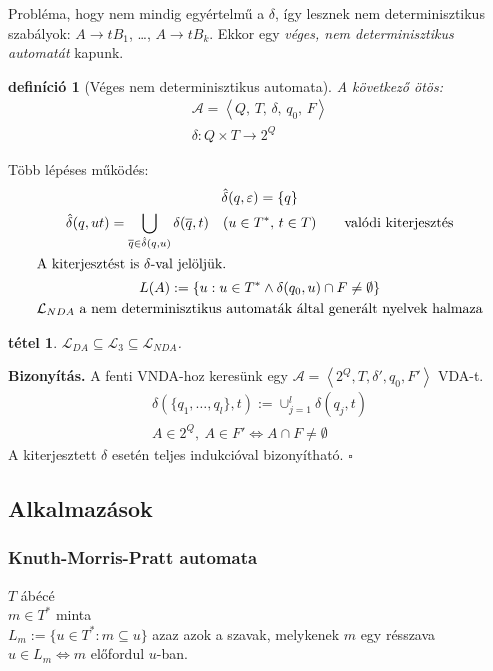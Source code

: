 \documentclass[fleqn,10pt,a4paper]{article}
\newcommand{\ob}{\hfill$\square$}
\renewcommand{\epsilon}{\varepsilon}
\theoremstyle{magyar}
\newtheorem{de}{definíció}[section]
\newtheorem{te}{tétel}[section]
\newenvironment{biz}{\begin{trivlist}\item\relax\mbox{\textbf{Bizonyítás.\enskip}}\ignorespaces}{\ob\end{trivlist}}
\newcommand{\Lang}{\mathcal{L}}
\newcommand{\A}{\mathcal{A}}
\newcommand{\VDA}{\A}
\newcommand{\VNDA}{\A}
\begin{document}
  Probléma, hogy nem mindig egyértelmű a $\delta$, így lesznek nem determinisztikus szabályok: $A\to tB_1$, \ldots,
  $A\to  tB_k$. Ekkor egy \emph{véges, nem determinisztikus automatát} kapunk.

  \begin{de}[Véges nem determinisztikus automata] A következő ötös:
    \begin{gather*}
      \VNDA = \left<Q,\,T,\,\delta,\,q_0,\,F\right>\\
      \delta\colon Q\times T\to 2^Q
    \end{gather*}
  \end{de}

  \noindent Több lépéses működés:
  \begin{gather*}
    \hat{\delta}(q,\epsilon) = \{q\}\\
    \hat{\delta}(q,ut)=\bigcup_{\overline{q}\in\hat{\delta}(q,u)}\delta(\overline{q},t)\quad(u\in T^*,\,t\in T)
    \qquad\text{valódi kiterjesztés}\\
    \intertext{A kiterjesztést is $\delta$-val jelöljük.}
    L(A) := \{ u : u\in T^* \land \delta(q_0,u) \cap F \neq \emptyset\}\\
    \Lang_{NDA} \text{ a nem determinisztikus automaták által generált nyelvek halmaza}
  \end{gather*}
  
  
  \begin{te} $\Lang_{DA} \subseteq \Lang_3 \subseteq \Lang_{NDA}$.
  \end{te}
  \begin{biz}
    A fenti VNDA-hoz keresünk egy $\VDA = \left< 2^Q,T,\delta',{q_0},F'\right>$ VDA-t.
    \begin{gather*}
      \delta(\{q_1,\ldots,q_l\},t) := \mathop{\cup}_{j=1}^l\delta(q_j,t)\\
      A\in 2^Q,\ A\in F' \Leftrightarrow A\cap F \neq \emptyset      
    \end{gather*}
    A kiterjesztett $\delta$ esetén teljes indukcióval bizonyítható.
  \end{biz}
  
  \subsection{Alkalmazások}
  \subsubsection{Knuth-Morris-Pratt automata}
  $T$ ábécé\\
  $m\in T^*$ minta\\
  $L_m := \{ u \in T^* : m \subseteq u \}$ azaz azok a szavak, melykenek $m$ egy résszava\\
  $u\in L_m \iff m$ előfordul $u$-ban.\\
  
\end{document}
